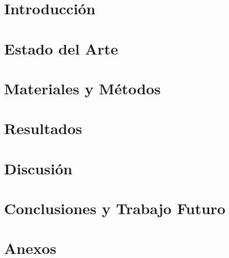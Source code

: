 \documentclass[a4paper,12pt]{article}
\begin{document}
\clearpage
\hypersetup{pageanchor=true}

\section{Introducción}

\clearpage

\section{Estado del Arte}

\clearpage

\section{Materiales y Métodos}

\clearpage

\section{Resultados}

\clearpage

\section{Discusión}

\clearpage

\section{Conclusiones y Trabajo Futuro}


\clearpage
{}


\clearpage
\section*{Anexos}

\end{document}
